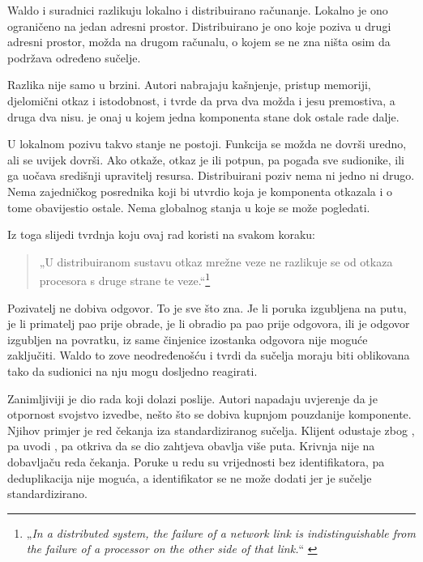 Waldo i suradnici razlikuju lokalno i distribuirano
računanje\cite{waldo1994note}. Lokalno je ono ograničeno na jedan adresni
prostor. Distribuirano je ono koje poziva u drugi adresni prostor, možda
na drugom računalu, o kojem se ne zna ništa osim da podržava određeno
sučelje.

Razlika nije samo u brzini. Autori nabrajaju kašnjenje, pristup memoriji,
djelomični otkaz i istodobnost, i tvrde da prva dva možda i jesu premostiva,
a druga dva nisu.  je onaj u
kojem jedna komponenta stane dok ostale rade dalje.

U lokalnom pozivu takvo stanje ne postoji. Funkcija se možda ne dovrši
uredno, ali se uvijek dovrši. Ako otkaže, otkaz je ili potpun, pa pogađa
sve sudionike, ili ga uočava središnji upravitelj resursa. Distribuirani
poziv nema ni jedno ni drugo. Nema zajedničkog posrednika koji bi utvrdio
koja je komponenta otkazala i o tome obavijestio ostale. Nema globalnog
stanja u koje se može pogledati.

Iz toga slijedi tvrdnja koju ovaj rad koristi na svakom koraku:

\begin{quote}
„U distribuiranom sustavu otkaz mrežne veze ne razlikuje se od otkaza
procesora s druge strane te veze.“\footnote{„\emph{In a distributed
system, the failure of a network link is indistinguishable from the
failure of a processor on the other side of that link.}“
\cite{waldo1994note}} \end{quote}

Pozivatelj ne dobiva odgovor. To je sve što zna. Je li poruka izgubljena
na putu, je li primatelj pao prije obrade, je li obradio pa pao prije
odgovora, ili je odgovor izgubljen na povratku, iz same činjenice izostanka
odgovora nije moguće zaključiti. Waldo to zove neodređenošću i tvrdi da
sučelja moraju biti oblikovana tako da sudionici na nju mogu dosljedno
reagirati.

Zanimljiviji je dio rada koji dolazi poslije. Autori napadaju uvjerenje da
je otpornost svojstvo izvedbe, nešto što se dobiva kupnjom pouzdanije
komponente. Njihov primjer je red čekanja iza standardiziranog sučelja.
Klijent odustaje zbog , pa uvodi
, pa otkriva da
se dio zahtjeva obavlja više puta. Krivnja nije na dobavljaču reda čekanja.
Poruke u redu su vrijednosti bez identifikatora, pa deduplikacija nije
moguća, a identifikator se ne može dodati jer je sučelje standardizirano.

